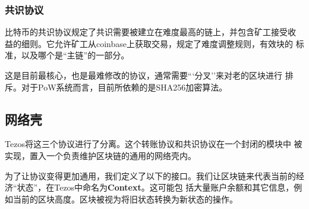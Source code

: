 \documentclass[letterpaper]{article}
\begin{document}
\subsubsection{共识协议}
比特币的共识协议规定了共识需要被建立在难度最高的链上，并包含矿工接受收
益的细则。它允许矿工从coinbase上获取交易，规定了难度调整规则，有效块的
标准，以及哪个是``主链''的一部分。

这是目前最核心，也是最难修改的协议，通常需要```分叉''来对老的区块进行
排斥。对于PoW系统而言，目前所依赖的是SHA256加密算法。

\subsection{网络壳}
Tezos将这三个协议进行了分离。这个转账协议和共识协议在一个封闭的模块中
被实现，置入一个负责维护区块链的通用的网络壳内。


为了让协议变得更加通用，我们定义了以下的接口。我们让区块链来代表当前的经济``状态''，在Tezos中命名为\textbf{Context}。这可能包
括大量账户余额和其它信息，例如当前的区块高度。区块被视为将旧状态转换为新状态的操作。
\end{document}

